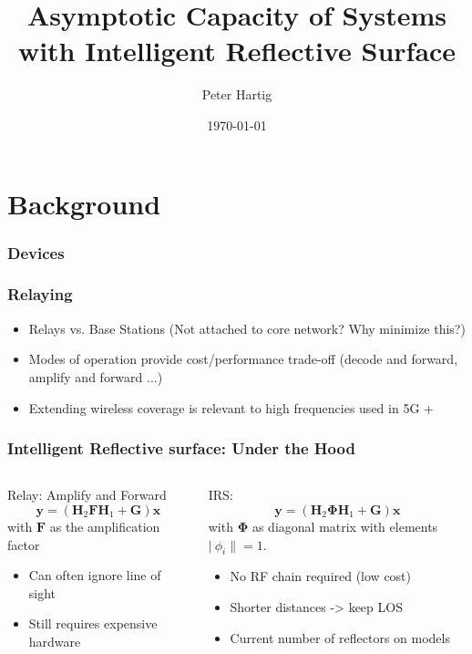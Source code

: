 \documentclass[10pt,tgadventor, onlymath]{beamer}
\title{\large \bfseries Asymptotic Capacity of Systems with Intelligent Reflective Surface}
\author{Peter Hartig\\[3ex]}
\date{\today}
\begin{document}
\frame{
\thispagestyle{empty}
\titlepage
}

\section{Background}
\subsubsection{Devices}
\begin{frame}
\frametitle{Relaying}

	\begin{itemize}
		\item 			
			Relays vs. Base Stations (Not attached to core network? Why minimize this?)
		\item 
			Modes of operation provide cost/performance trade-off (decode and forward, amplify and forward ...)
		\item 
			Extending wireless coverage is relevant to high frequencies used in 5G +
	\end{itemize}
\end{frame}

\begin{frame}
\frametitle{Intelligent Reflective surface: Under the Hood}
\begin{columns}
\begin{column}{0.5\linewidth}
	Relay: Amplify and Forward
	\begin{equation*}
	\mathbf{y} = (\mathbf{H}_2\mathbf{F}\mathbf{H}_1 + \mathbf{G})\mathbf{x}
	\end{equation*}
	with $\mathbf{F}$ as the amplification factor
	\begin{itemize}
	\item 
		Can often ignore line of sight
	\item 
		Still requires expensive hardware
	\end{itemize}
\end{column}

\begin{column}{0.5\linewidth}
	IRS:
	\begin{equation*}
	\mathbf{y} = (\mathbf{H}_2\boldsymbol{\Phi}\mathbf{H}_1 + \mathbf{G})\mathbf{x}
	\end{equation*}
	with $\boldsymbol{\Phi}$ as diagonal matrix with elements $|\ \phi_i \| =1$.
	\begin{itemize}
	\item 
		No RF chain required (low cost)
	\item
		Shorter distances -> keep LOS
	\item 
		Current number of reflectors on models
	\end{itemize}
\end{column}
\end{columns}
\end{frame}
\end{document}
